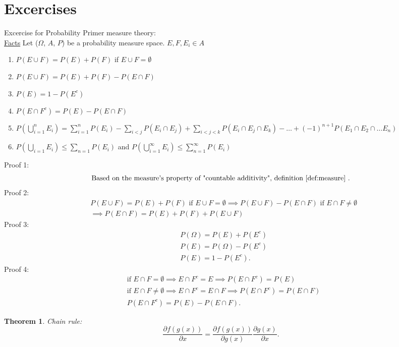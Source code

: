 \documentclass{article}
\newtheorem{theorem}{Theorem}
\begin{document}
\section{Excercises}
Excercise for Probability Primer measure theory: \\
\underline{Facts} Let ($\Omega$, $A$, $P$) be a probability measure space. $E, F, E_i \in A$
\begin{enumerate}
    \item $P(E \cup F) = P(E) + P(F)$ if $E \cup F = \emptyset$
    \item $P(E \cup F) = P(E) + P(F) - P(E \cap F)$ 
    \item $P(E) = 1-P(E^c)$
    \item $P(E \cap F^c) = P(E) - P(E \cap F)$
    \item $P(\bigcup_{i=1}^{n} E_i) = \sum_{i=1}^{n} P(E_i) - \sum_{i < j} P(E_i \cap E_j) + \sum_{i < j < k} P(E_i \cap E_j \cap E_k) - \dots + (-1)^{n+1} P(E_1 \cap E_2 \cap \dots E_n)$
\item $P(\bigcup_{i=1} E_i) \le \sum_{n=1} P(E_i)$ and $P(\bigcup_{i=1}^{\infty} E_i) \le \sum_{n=1}^{\infty} P(E_i)$ 
\end{enumerate}
Proof 1: 
\[
    \text{Based on the measure's property of "countable additivity", definition \ref{def:measure} }
.\] 
Proof 2: 
\begin{align*}
    & P(E \cup F) = P(E) + P(F) \text{ if } E \cup F = \emptyset \implies P(E \cup F) - P(E \cap F) \text{ if } E \cap F \neq \emptyset \\
    & \implies  P(E \cap F) = P(E) + P(F) + P(E \cup F)
\end{align*}
Proof 3: 
\begin{align*}
    & P(\Omega) = P(E) + P(E^c) \\
    & P(E) = P(\Omega) - P(E^c) \\ 
    & P(E) = 1 - P(E^c)
.\end{align*}
Proof 4: 
\begin{align*}
    &\text{if } E \cap F =\emptyset \implies E \cap F^c = E \implies P(E \cap F^c) = P(E) \\
    &\text{if } E \cap F \neq \emptyset \implies E \cap F^c = E \cap F \implies P(E \cap F^c) = P(E \cap F) \\
    & P(E \cap F^c) = P(E) - P(E \cap F)
.\end{align*}


\newpage 

\begin{theorem}
    Chain rule:
\[
    \frac{\partial f(g(x))}{\partial x} = \frac{\partial f(g(x))}{\partial g(x)} \frac{\partial g(x)}{\partial x} 
.\] 
\end{theorem}
\end{document}
